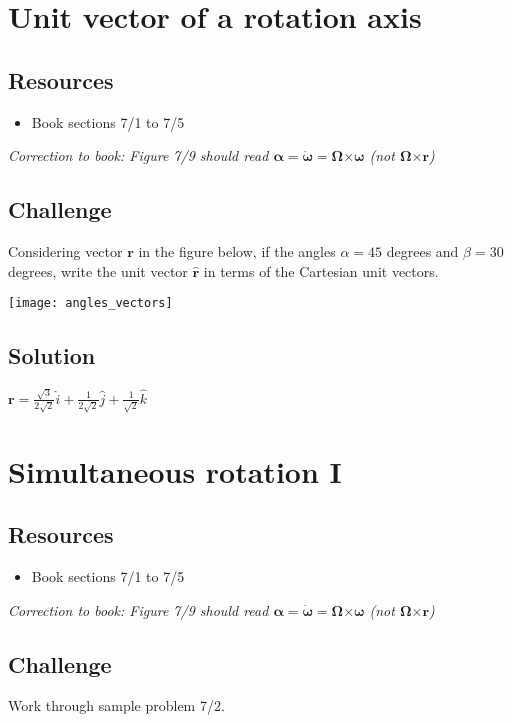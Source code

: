 \newpage
\section{Unit vector of a rotation axis}

\subsection*{Resources}
\begin{itemize}
    \item Book sections 7/1 to 7/5
\end{itemize}

\emph{Correction to book: Figure 7/9 should read $\bm{\alpha} = \bm{\dot{\omega}} = \bm{\Omega} \bm{\times} \bm{\omega}$ (not $\bm{\Omega} \bm{\times} \bm{r}$)}

\subsection*{Challenge}
Considering vector $\bm{r}$ in the figure below, if the angles $\alpha = 45$ degrees and $\beta = 30$ degrees, write the unit vector $\bm{\hat{r}}$ in terms of the Cartesian unit vectors.

\texttt{[image: angles\_vectors]}

\subsection*{Solution}
$\bm{r} = \frac{\sqrt{3}}{2\sqrt{2}} \hat{i} + \frac{1}{2\sqrt{2}} \hat{j} + \frac{1}{\sqrt{2}} \hat{k}$


\newpage
\section{Simultaneous rotation I}

\subsection*{Resources}
\begin{itemize}
    \item Book sections 7/1 to 7/5
\end{itemize}

\emph{Correction to book: Figure 7/9 should read $\bm{\alpha} = \bm{\dot{\omega}} = \bm{\Omega} \bm{\times} \bm{\omega}$ (not $\bm{\Omega} \bm{\times} \bm{r}$)}

\subsection*{Challenge}
Work through sample problem 7/2.





